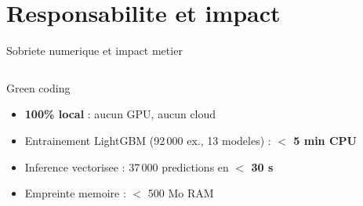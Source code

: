 \documentclass[aspectratio=169, 10pt]{beamer}
\begin{document}
\section{Responsabilite et impact}

\begin{frame}{Sobriete numerique et impact metier}
  \begin{columns}[T]
      \begin{exampleblock}{Green coding}
        \begin{itemize}
          \item \textbf{100\% local} : aucun GPU, aucun cloud
          \item Entrainement LightGBM (92\,000 ex., 13 modeles) : \textbf{$<$ 5 min CPU}
          \item Inference vectorisee : 37\,000 predictions en \textbf{$<$ 30 s}
          \item Empreinte memoire : $<$ 500 Mo RAM
        \end{itemize}
      \end{exampleblock}
      \vspace{0.2cm}


\end{columns}
\end{frame}
\end{document}
